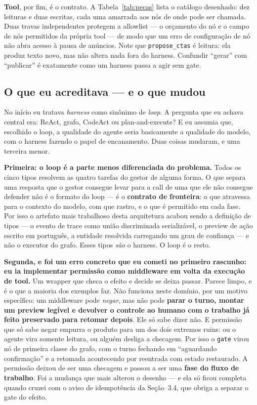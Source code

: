 \documentclass[10pt,twocolumn]{article}
\newcommand{\code}[1]{\texttt{\footnotesize #1}}
\begin{document}
\textbf{Tool}, por fim, é o contrato. A Tabela~\ref{tab:pecas} lista o catálogo desenhado:
dez leituras e duas escritas, cada uma amarrada aos nós de onde pode ser chamada. Duas
travas independentes protegem a allowlist --- o orçamento do nó e o campo de nós permitidos
da própria tool --- de modo que um erro de configuração de nó não abra acesso à pausa de
anúncios. Note que \code{propose\_ctas} é leitura: ela produz texto novo, mas não altera
nada fora do harness. Confundir ``gerar'' com ``publicar'' é exatamente como um harness
passa a agir sem gate.


\subsection{O que eu acreditava --- e o que mudou}

No início eu tratava \emph{harness} como sinônimo de \emph{loop}. A pergunta que eu achava
central era: ReAct, grafo, CodeAct ou plan-and-execute? E eu assumia que, escolhido o loop,
a qualidade do agente seria basicamente a qualidade do modelo, com o harness fazendo o papel
de encanamento. Duas coisas mudaram, e uma terceira menor.

\textbf{Primeira: o loop é a parte menos diferenciada do problema.} Todos os cinco tipos
resolvem as quatro tarefas do gestor de alguma forma. O que separa uma resposta que o gestor
consegue levar para a call de uma que ele não consegue defender não é o formato do loop --- é
o \textbf{contrato de fronteira}: o que atravessa para o contexto do modelo, com que rastro,
e o que é permitido em cada fase. Por isso o artefato mais trabalhoso desta arquitetura
acabou sendo a definição de tipos --- o evento de trace como união discriminada
serializável, o preview de ação escrito em português, a entidade resolvida carregando um
grau de confiança --- e não o executor do grafo. Esses tipos \emph{são} o harness. O loop é o
resto.

\textbf{Segunda, e foi um erro concreto que eu cometi no primeiro rascunho: eu ia
implementar permissão como middleware em volta da execução de tool.} Um wrapper que checa o
efeito e decide se deixa passar. Parece limpo, e é o que a maioria dos exemplos faz. Não
funciona neste domínio, por um motivo específico: um middleware pode \emph{negar}, mas não
pode \textbf{parar o turno, montar um preview legível e devolver o controle ao humano com o
trabalho já feito preservado para retomar depois}. Ele só sabe dizer não. E permissão que só
sabe negar empurra o produto para um dos dois extremos ruins: ou o agente vira somente
leitura, ou alguém desliga a checagem. Por isso o \code{gate} virou nó de primeira classe do
grafo, com o turno fechando em ``aguardando confirmação'' e a retomada acontecendo por
reentrada com estado restaurado. A permissão deixou de ser uma checagem e passou a ser uma
\textbf{fase do fluxo de trabalho}. Foi a mudança que mais alterou o desenho --- e ela só
ficou completa quando cruzei com o aviso de idempotência da Seção~3.4, que obriga a separar
o gate do efeito.
\end{document}

